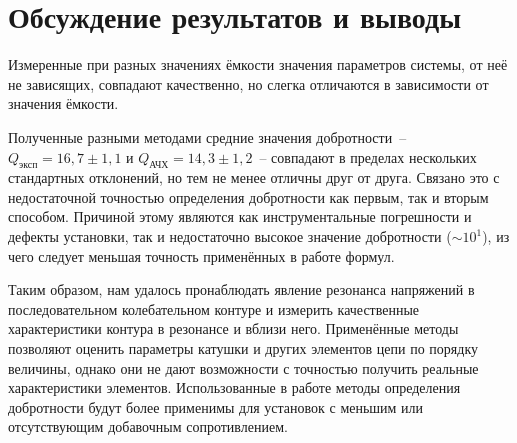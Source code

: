 \documentclass[a4paper,12pt]{article} %
\begin{document}
\section{Обсуждение результатов и выводы}

Измеренные при разных значениях ёмкости значения параметров системы, от неё не зависящих, совпадают качественно, но слегка отличаются в зависимости от значения ёмкости.

Полученные разными методами средние значения добротности~-- $Q_\text{эксп} = 16,7\pm1,1$ и $Q_\text{АЧХ} = 14,3\pm1,2$~-- совпадают в пределах нескольких стандартных отклонений, но тем не менее отличны друг от друга. Связано это с недостаточной точностью определения добротности как первым, так и вторым способом. Причиной этому являются как инструментальные погрешности и дефекты установки, так и недостаточно высокое значение добротности ($\sim10^1$), из чего следует меньшая точность применённых в работе формул.

Таким образом, нам удалось пронаблюдать явление резонанса напряжений в последовательном колебательном контуре и измерить качественные характеристики контура в резонансе и вблизи него. Применённые методы позволяют оценить параметры катушки и других элементов цепи по порядку величины, однако они не дают возможности с точностью получить реальные характеристики элементов. Использованные в работе методы определения добротности будут более применимы для установок с меньшим или отсутствующим добавочным сопротивлением.
\end{document}

